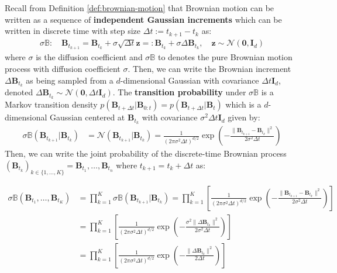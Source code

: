 \documentclass{article}
\begin{document}
Recall from Definition \ref{def:brownian-motion} that Brownian motion can be written as a sequence of \textbf{independent Gaussian increments} which can be written in discrete time with step size $\Delta t:=t_{k+1}-t_k$ as:
\begin{align}
    \sigma\mathbb{B}: \quad \boldsymbol{B}_{t_{k+1}}=\boldsymbol{B}_{t_k}+\sigma\sqrt{\Delta t}\boldsymbol{z}=:\boldsymbol{B}_{t_k}+ \sigma\Delta \boldsymbol{B}_{t_k}, \quad \boldsymbol{z}\sim \mathcal{N}(\boldsymbol{0}, \boldsymbol{I}_d)\label{eq:discrete-brownian}
\end{align}
where $\sigma$ is the diffusion coefficient and $\sigma\mathbb{B}$ to denotes the pure Brownian motion process with diffusion coefficient $\sigma$. Then, we can write the Brownian increment $\Delta \boldsymbol{B}_{t_k}$ as being sampled from a $d$-dimensional Gaussian with covariance $\Delta t\boldsymbol{I}_d$, denoted $\Delta\boldsymbol{B}_{t_k}\sim \mathcal{N}(\boldsymbol{0}, \Delta t\boldsymbol{I}_d)$. The \textbf{transition probability} under $\sigma\mathbb{B}$ is a Markov transition density $p(\boldsymbol{B}_{t+\Delta t}|\boldsymbol{B}_{0:t})=p(\boldsymbol{B}_{t+\Delta t}|\boldsymbol{B}_t)$ which is a $d$-dimensional Gaussian centered at $\boldsymbol{B}_{t_k}$ with covariance $\sigma^2\Delta t\boldsymbol{I}_d$ given by:
\begin{align}
    \sigma\mathbb{B}(\boldsymbol{B}_{t_{k+1}}|\boldsymbol{B}_{t_k})&=\mathcal{N}(\boldsymbol{B}_{t_{k+1}}|\boldsymbol{B}_{t_k})=\frac{1}{(2\pi\sigma^2\Delta t)^{d/2}}\exp\left(-\frac{\|\boldsymbol{B}_{t_{k+1}}-\boldsymbol{B}_{t_k}\|^2}{2\sigma^2\Delta t}\right)
\end{align}
Then, we can write the joint probability of the discrete-time Brownian process $(\boldsymbol{B}_{t_k})_{k\in \{1, \dots, K\}}=\boldsymbol{B}_{t_1}, \dots, \boldsymbol{B}_{t_n}$ where $t_{k+1}=t_k+\Delta t$ as:
\begin{small}
\begin{align}
    \sigma\mathbb{B}(\boldsymbol{B}_{t_1}, \dots , \boldsymbol{B}_{t_K})&=\prod_{k=1}^K \sigma\mathbb{B}(\boldsymbol{B}_{t_{k+1}}|\boldsymbol{B}_{t_k})=\prod_{k=1}^K \left[\frac{1}{(2\pi\sigma^2\Delta t)^{d/2}}\exp\left(-\frac{\|\boldsymbol{B}_{t_{k+1}}-\boldsymbol{B}_{t_k}\|^2}{2\sigma^2\Delta t}\right)\right]\nonumber\\
    &=\prod_{k=1}^K \left[\frac{1}{(2\pi\sigma^2\Delta t)^{d/2}}\exp\left(-\frac{\sigma^2\|\Delta \boldsymbol{B}_{t_k}\|^2}{2\sigma^2\Delta t}\right)\right]\nonumber\\
    &=\prod_{k=1}^K \left[\frac{1}{(2\pi\sigma^2\Delta t)^{d/2}}\exp\left(-\frac{\|\Delta \boldsymbol{B}_{t_k}\|^2}{2\Delta t}\right)\right]
\end{align}
\end{small}
\end{document}
